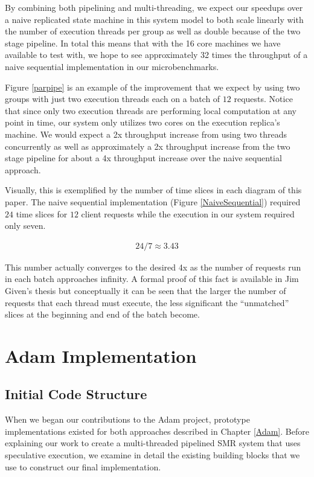 \documentclass[11pt, oneside]{report}
\begin{document}
By combining both pipelining and multi-threading, we expect our speedups over a naive replicated state machine in this system model to both scale linearly with the number of execution threads per group as well as double because of the two stage pipeline. 
In total this means that with the 16 core machines we have available to test with, we hope to see approximately 32 times the throughput of a naive sequential implementation in our microbenchmarks. 

Figure \ref{parpipe} is an example of the improvement that we expect by using two groups with just two execution threads each on a batch of $12$ requests.
Notice that since only two execution threads are performing local computation at any point in time, our system only utilizes two cores on the execution replica's machine.
We would expect a 2x throughput increase from using two threads concurrently as well as approximately a 2x throughput increase from the two stage pipeline for about a 4x throughput increase over the naive sequential approach.

Visually, this is exemplified by the number of time slices in each diagram of this paper.
The naive sequential implementation (Figure \ref{NaiveSequential}) required $24$ time slices for $12$ client requests while the execution in our system required only seven.

\begin{align*}
24 / 7 \approx 3.43
\end{align*}

This number actually converges to the desired 4x as the number of requests run in each batch approaches infinity.
A formal proof of this fact is available in Jim Given's thesis \cite{jim} but conceptually it can be seen that the larger the number of requests that each thread must execute, the less significant the ``unmatched'' slices at the beginning and end of the batch become. 

\chapter{Adam Implementation}\label{AdamImplementation}

\section{Initial Code Structure}\label{existing}

When we began our contributions to the Adam project, prototype implementations existed for both approaches described in Chapter \ref{Adam}. 
Before explaining our work to create a multi-threaded pipelined SMR system that uses speculative execution, we examine in detail the existing building blocks that we use to construct our final implementation.
\end{document}
